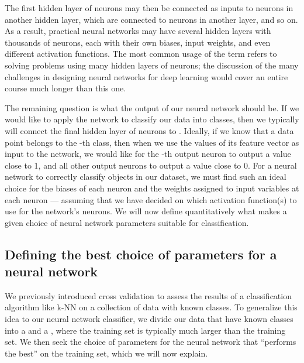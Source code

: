 The first hidden layer of neurons may then be connected as inputs to neurons in another hidden layer, which are connected to neurons in another layer, and so on. As a result, practical neural networks may have several hidden layers with thousands of neurons, each with their own biases, input weights, and even different activation functions. The most common usage of the term  refers to solving problems using many hidden layers of neurons; the discussion of the many challenges in designing neural networks for deep learning would cover an entire course much longer than this one.

The remaining question is what the output of our neural network should be. If we would like to apply the network to classify our data into  classes, then we typically will connect the final hidden layer of neurons to  . Ideally, if we know that a data point  belongs to the -th class, then when we use the values of its feature vector as input to the network, we would like for the -th output neuron to output a value close to 1, and all other output neurons to output a value close to 0. For a neural network to correctly classify objects in our dataset, we must find such an ideal choice for the biases of each neuron and the weights assigned to input variables at each neuron --- assuming that we have decided on which activation function(s) to use for the network's neurons. We will now define quantitatively what makes a given choice of neural network parameters suitable for classification.\\

\begin{qbox}\end{qbox}

\subsection{Defining the best choice of parameters for a neural network}

We previously introduced cross validation to assess the results of a classification algorithm like k-NN on a collection of data with known classes. To generalize this idea to our neural network classifier, we divide our data that have known classes into a  and a , where the training set is typically much larger than the training set. We then seek the choice of parameters for the neural network that ``performs the best'' on the training set, which we will now explain.

